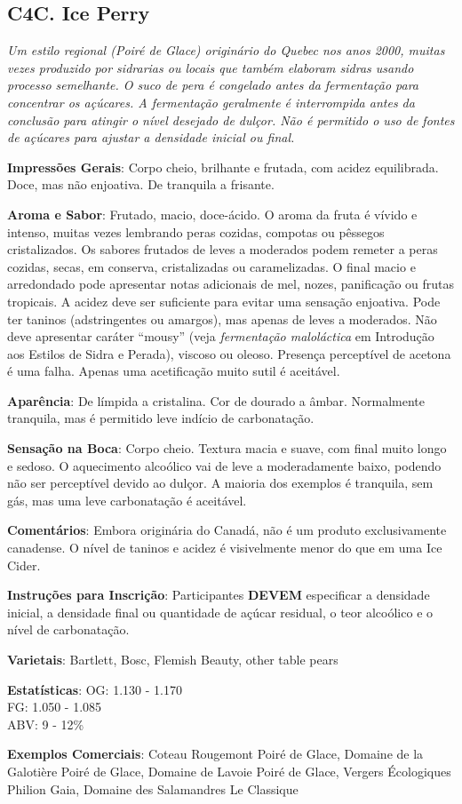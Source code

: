 \subsection*{C4C. Ice Perry}

\textit{Um estilo regional (\textit{Poiré de Glace}) originário do Quebec nos anos 2000, muitas vezes produzido por sidrarias ou locais que também elaboram sidras usando processo semelhante. O suco de pera é congelado antes da fermentação para concentrar os açúcares. A fermentação geralmente é interrompida antes da conclusão para atingir o nível desejado de dulçor. Não é permitido o uso de fontes de açúcares para ajustar a densidade inicial ou final.}

\textbf{Impressões Gerais}: Corpo cheio, brilhante e frutada, com acidez equilibrada. Doce, mas não enjoativa. De tranquila a frisante.

\textbf{Aroma e Sabor}: Frutado, macio, doce-ácido. O aroma da fruta é vívido e intenso, muitas vezes lembrando peras cozidas, compotas ou pêssegos cristalizados. Os sabores frutados de leves a moderados podem remeter a peras cozidas, secas, em conserva, cristalizadas ou caramelizadas. O final macio e arredondado pode apresentar notas adicionais de mel, nozes, panificação ou frutas tropicais. A acidez deve ser suficiente para evitar uma sensação enjoativa. Pode ter taninos (adstringentes ou amargos), mas apenas de leves a moderados. Não deve apresentar caráter “mousy” (veja \textit{fermentação maloláctica} em Introdução aos Estilos de Sidra e Perada), viscoso ou oleoso. Presença perceptível de acetona é uma falha. Apenas uma acetificação muito sutil é aceitável.

\textbf{Aparência}: De límpida a cristalina. Cor de dourado a âmbar. Normalmente tranquila, mas é permitido leve indício de carbonatação.

\textbf{Sensação na Boca}: Corpo cheio. Textura macia e suave, com final muito longo e sedoso. O aquecimento alcoólico vai de leve a moderadamente baixo, podendo não ser perceptível devido ao dulçor. A maioria dos exemplos é tranquila, sem gás, mas uma leve carbonatação é aceitável.

\textbf{Comentários}: Embora originária do Canadá, não é um produto exclusivamente canadense. O nível de taninos e acidez é visivelmente menor do que em uma Ice Cider.

\textbf{Instruções para Inscrição}: Participantes \textbf{DEVEM} especificar a densidade inicial, a densidade final ou quantidade de açúcar residual, o teor alcoólico e o nível de carbonatação.

\textbf{Varietais}: Bartlett, Bosc, Flemish Beauty, other table pears

\textbf{Estatísticas}: OG: 1.130 - 1.170 \\
\phantom{ } \hspace{16.5mm} FG: 1.050 - 1.085 \\
\phantom{ } \hspace{16.5mm} ABV: 9 - 12\%

\textbf{Exemplos Comerciais}: Coteau Rougemont Poiré de Glace, Domaine de la Galotière Poiré de Glace, Domaine de Lavoie Poiré de Glace, Vergers Écologiques Philion Gaia, Domaine des Salamandres Le Classique
